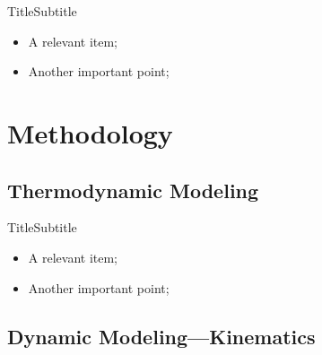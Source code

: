     \begin{frame}{Title}{Subtitle}\vspace*{-2em}
        \begin{itemize}
            \item<2->  A \alert{relevant} item;
            \item<3->  Another \alert{important} point;
        \end{itemize}
    \end{frame}

\section{Methodology}

\subsection{Thermodynamic Modeling}

    \begin{frame}{Title}{Subtitle}\vspace*{-2em}
        \begin{itemize}
            \item<2->  A \alert{relevant} item;
            \item<3->  Another \alert{important} point;
        \end{itemize}
    \end{frame}

\subsection{Dynamic Modeling---Kinematics}

